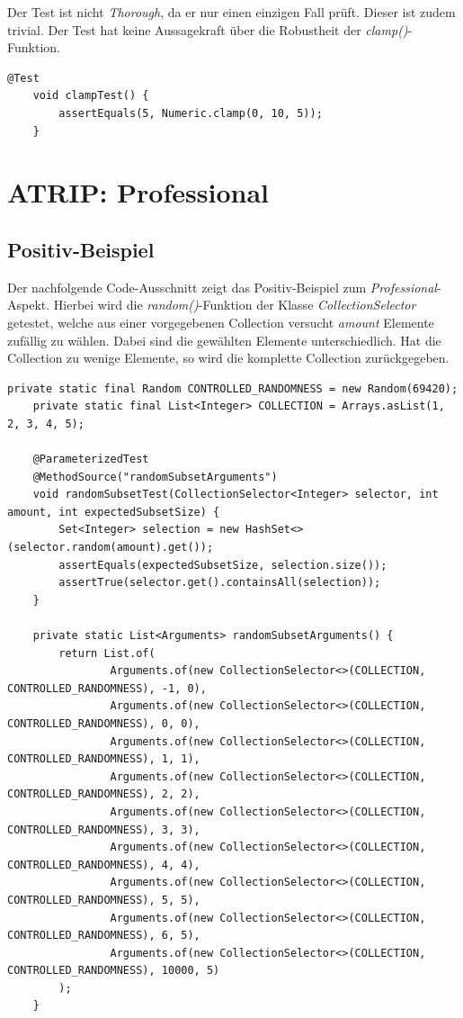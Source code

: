 Der Test ist nicht \textit{Thorough}, da er nur einen einzigen Fall
prüft. Dieser ist zudem trivial. Der Test hat keine Aussagekraft über
die Robustheit der \textit{clamp()}-Funktion.

\vspace{0.5cm}
\begin{lstlisting}[caption={ATRIP: Thorough / Negativ}]
    @Test
    void clampTest() {
        assertEquals(5, Numeric.clamp(0, 10, 5));
    }
\end{lstlisting}

\section{ATRIP: Professional}
\subsection*{Positiv-Beispiel}
Der nachfolgende Code-Ausschnitt zeigt das Positiv-Beispiel zum
\textit{Professional}-Aspekt. Hierbei wird die
\textit{random()}-Funktion der Klasse
\textit{CollectionSelector} getestet, welche aus einer vorgegebenen
Collection versucht \textit{amount} Elemente zufällig zu wählen.
Dabei sind die gewählten Elemente unterschiedlich. Hat die Collection
zu wenige Elemente, so wird die komplette Collection zurückgegeben. 

\vspace{0.5cm}
\begin{lstlisting}[caption={ATRIP: Professional / Positiv}]
    private static final Random CONTROLLED_RANDOMNESS = new Random(69420);
    private static final List<Integer> COLLECTION = Arrays.asList(1, 2, 3, 4, 5);
    
    @ParameterizedTest
    @MethodSource("randomSubsetArguments")
    void randomSubsetTest(CollectionSelector<Integer> selector, int amount, int expectedSubsetSize) {
        Set<Integer> selection = new HashSet<>(selector.random(amount).get());
        assertEquals(expectedSubsetSize, selection.size());
        assertTrue(selector.get().containsAll(selection));
    }
    
    private static List<Arguments> randomSubsetArguments() {
        return List.of(
                Arguments.of(new CollectionSelector<>(COLLECTION, CONTROLLED_RANDOMNESS), -1, 0),
                Arguments.of(new CollectionSelector<>(COLLECTION, CONTROLLED_RANDOMNESS), 0, 0),
                Arguments.of(new CollectionSelector<>(COLLECTION, CONTROLLED_RANDOMNESS), 1, 1),
                Arguments.of(new CollectionSelector<>(COLLECTION, CONTROLLED_RANDOMNESS), 2, 2),
                Arguments.of(new CollectionSelector<>(COLLECTION, CONTROLLED_RANDOMNESS), 3, 3),
                Arguments.of(new CollectionSelector<>(COLLECTION, CONTROLLED_RANDOMNESS), 4, 4),
                Arguments.of(new CollectionSelector<>(COLLECTION, CONTROLLED_RANDOMNESS), 5, 5),
                Arguments.of(new CollectionSelector<>(COLLECTION, CONTROLLED_RANDOMNESS), 6, 5),
                Arguments.of(new CollectionSelector<>(COLLECTION, CONTROLLED_RANDOMNESS), 10000, 5)
        );
    }
\end{lstlisting}

